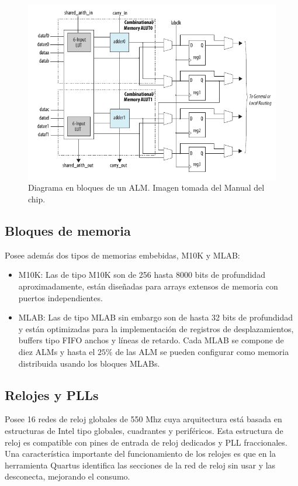\begin{figure}
\centering
\includegraphics[scale=.75]{./Figures/diag_bloques_ALM.png}
\caption{Diagrama en bloques de un ALM. Imagen tomada del Manual del chip.}
\label{ALM_diag_bloques}
\end{figure}



\subsection{Bloques de memoria}

Posee además dos tipos de memorias embebidas, M10K y MLAB:

\begin{itemize}
\item
M10K: Las de tipo M10K son de 256 hasta 8000 bits de profundidad aproximadamente, están diseñadas para arrays extensos de memoria con puertos independientes.
\item
MLAB: Las de tipo MLAB sin embargo son de hasta 32 bits de profundidad y están optimizadas para la implementación de registros de desplazamientos, buffers tipo FIFO anchos y líneas de retardo. Cada MLAB se compone de diez ALMs y hasta el $25\%$ de las ALM se pueden configurar como memoria distribuida usando los bloques MLABs.
\end{itemize}

\subsection{Relojes y PLLs}
Posee 16 redes de reloj globales de 550 Mhz cuya arquitectura está basada en estructuras de Intel tipo globales, cuadrantes y periféricos. Esta estructura de reloj es compatible con pines de entrada de reloj dedicados y PLL fraccionales. Una característica importante del funcionamiento de los relojes es que en la herramienta Quartus identifica las secciones de la red de reloj sin usar y las desconecta, mejorando el consumo.


